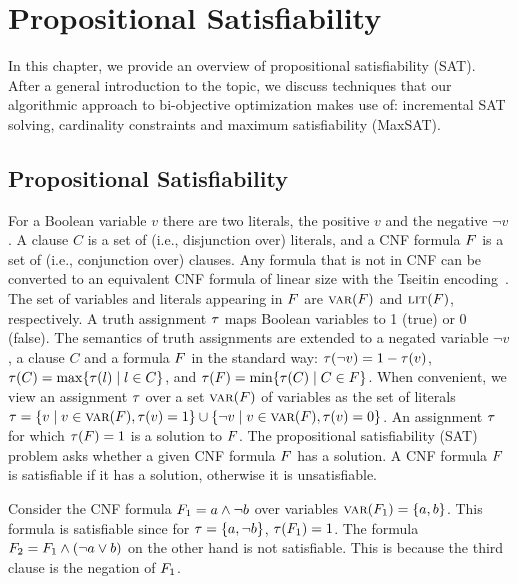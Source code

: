 \chapter{Propositional Satisfiability\label{chap:satisfiability}}

In this chapter, we provide an overview of propositional satisfiability (SAT).
After a general introduction to the topic, we discuss techniques that our algorithmic approach to bi-objective optimization makes use of: incremental SAT solving, cardinality constraints and maximum satisfiability (MaxSAT).

\section{Propositional Satisfiability\label{sec:sat}}

For a Boolean variable $v$ there are two literals, the positive $v$ and the negative $\lnot v$. 
A clause $C$ is a set of (i.e., disjunction over) literals, and a CNF formula $F$ is a set of (i.e., conjunction over) clauses.
Any formula that is not in CNF can be converted to an equivalent CNF formula of linear size with the Tseitin encoding~\autocites{handbook2-cnf,Tseitin1983ComplexityDerivationPropositional}.
The set of variables and literals appearing in $F$ are $\textsc{var}(F)$ and $\textsc{lit}(F)$, respectively.  
A truth assignment $\tau$ maps Boolean variables to 1 (true) or 0 (false).
The semantics of truth assignments are extended to a negated variable $\lnot v$, a clause $C$ and a formula $F$ in the standard way:
$\tau(\lnot v) = 1 - \tau(v)$, $\tau(C) = \max\{ \tau(l) \mid l \in C\}$, and $\tau(F) = \min\{\tau(C) \mid C \in F\}$.
When convenient, we view an assignment $\tau$ over a set $\textsc{var}(F)$ of variables as the set of literals $\tau = \{ v \mid v \in \textsc{var}(F),  \tau(v) = 1\} \cup \{ \lnot v \mid v \in \textsc{var}(F), \tau(v) = 0\}$.
An assignment $\tau$ for which $\tau(F) = 1$ is a solution to $F$.
The propositional satisfiability (SAT) problem asks whether a given CNF formula $F$ has a solution.
A CNF formula $F$ is satisfiable if it has a solution, otherwise it is unsatisfiable.

\begin{example}
  Consider the CNF formula $F_1 = a \land \lnot b$ over variables $\textsc{var}(F_1) = \{a,b\}$.
  This formula is satisfiable since for $\tau=\{a,\lnot b\}$, $\tau(F_1)=1$.
  The formula $F_2 = F_1 \land (\lnot a \lor b)$ on the other hand is not satisfiable.
  This is because the third clause is the negation of $F_1$.
\end{example}

